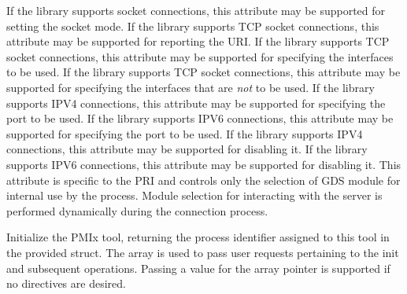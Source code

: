  If the library supports socket connections, this attribute may be supported for setting the socket mode.
\pasteAttributeItemEnd{}
 If the library supports TCP socket connections, this attribute may be supported for reporting the URI.
\pastePRIAttributeItemEnd{}
 If the library supports TCP socket connections, this attribute may be supported for specifying the interfaces to be used.
\pastePRIAttributeItemEnd{}
 If the library supports TCP socket connections, this attribute may be supported for specifying the interfaces that are \textit{not} to be used.
\pastePRIAttributeItemEnd{}
 If the library supports IPV4 connections, this attribute may be supported for specifying the port to be used.
\pastePRIAttributeItemEnd{}
 If the library supports IPV6 connections, this attribute may be supported for specifying the port to be used.
\pastePRIAttributeItemEnd{}
 If the library supports IPV4 connections, this attribute may be supported for disabling it.
\pastePRIAttributeItemEnd{}
 If the library supports IPV6 connections, this attribute may be supported for disabling it.
\pastePRIAttributeItemEnd{}
 This attribute is specific to the \ac{PRI} and controls only the selection of \ac{GDS} module for internal use by the process. Module selection for interacting with the server is performed dynamically during the connection process.
\pastePRIAttributeItemEnd{}

\optattrend

\descr

Initialize the \ac{PMIx} tool, returning the process identifier assigned to this tool in the provided  struct. The  array is used to pass user requests pertaining to the init and subsequent operations. Passing a  value for the array pointer is supported if no directives are desired.


